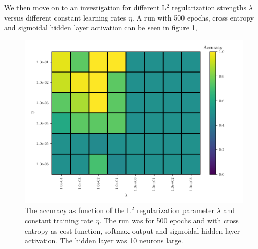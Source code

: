 We then move on to an investigation for different L$^2$ regularization strengths $\lambda$ versus different constant learning rates $\eta$. A run with 500 epochs, cross entropy and sigmoidal hidden layer activation can be seen in figure \ref{fig:mlp-eta-lambda},
\begin{figure}[H]
    \centering
    \includegraphics[scale=1.0]{../fig/mlp_lambda_eta.pdf}
    \caption{The accuracy as function of the L$^2$ regularization parameter $\lambda$ and constant training rate $\eta$. The run was for 500 epochs and with cross entropy as cost function, softmax output and sigmoidal hidden layer activation. The hidden layer was 10 neurons large.}
    \label{fig:mlp-eta-lambda}
\end{figure}

